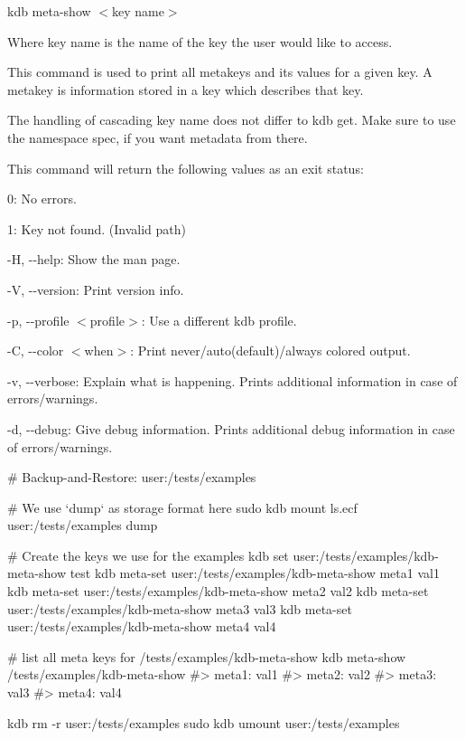 {\ttfamily kdb meta-\/show $<$key name$>$}~\newline


Where {\ttfamily key name} is the name of the key the user would like to access.

This command is used to print all metakeys and its values for a given key. A metakey is information stored in a key which describes that key.

The handling of cascading {\ttfamily key name} does not differ to {\ttfamily kdb get}. Make sure to use the namespace {\ttfamily spec}, if you want metadata from there.

This command will return the following values as an exit status\+:~\newline



\begin{DoxyItemize}
\item 0\+: No errors.
\item 1\+: Key not found. (Invalid {\ttfamily path})
\end{DoxyItemize}


\begin{DoxyItemize}
\item {\ttfamily -\/H}, {\ttfamily -\/-\/help}\+: Show the man page.
\item {\ttfamily -\/V}, {\ttfamily -\/-\/version}\+: Print version info.
\item {\ttfamily -\/p}, {\ttfamily -\/-\/profile $<$profile$>$}\+: Use a different kdb profile.
\item {\ttfamily -\/C}, {\ttfamily -\/-\/color $<$when$>$}\+: Print never/auto(default)/always colored output.
\item {\ttfamily -\/v}, {\ttfamily -\/-\/verbose}\+: Explain what is happening. Prints additional information in case of errors/warnings.
\item {\ttfamily -\/d}, {\ttfamily -\/-\/debug}\+: Give debug information. Prints additional debug information in case of errors/warnings.
\end{DoxyItemize}


\begin{DoxyCode}
# Backup-and-Restore: user:/tests/examples

# We use `dump` as storage format here
sudo kdb mount ls.ecf user:/tests/examples dump

# Create the keys we use for the examples
kdb set user:/tests/examples/kdb-meta-show test
kdb meta-set user:/tests/examples/kdb-meta-show meta1 val1
kdb meta-set user:/tests/examples/kdb-meta-show meta2 val2
kdb meta-set user:/tests/examples/kdb-meta-show meta3 val3
kdb meta-set user:/tests/examples/kdb-meta-show meta4 val4

# list all meta keys for /tests/examples/kdb-meta-show
kdb meta-show /tests/examples/kdb-meta-show
#> meta1: val1
#> meta2: val2
#> meta3: val3
#> meta4: val4

kdb rm -r user:/tests/examples
sudo kdb umount user:/tests/examples
\end{DoxyCode}



